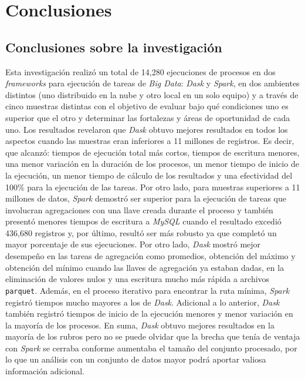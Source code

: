 \chapter*{Conclusiones}


\section{Conclusiones sobre la investigación}

Esta investigación realizó un total de 14,280 ejecuciones de procesos en dos \textit{frameworks} para ejecución de tareas de \textit{Big Data}: \textit{Dask} y \textit{Spark}, en dos ambientes distintos (uno distribuido en la nube y otro local en un solo equipo) y a través de cinco muestras distintas con el objetivo de evaluar bajo qué condiciones uno es superior que el otro y determinar las fortalezas y áreas de oportunidad de cada uno. Los resultados revelaron que \textit{Dask} obtuvo mejores resultados en todos los aspectos cuando las muestras eran inferiores a 11 millones de registros. Es decir, que alcanzó: tiempos de ejecución total más cortos, tiempos de escritura menores, una menor variación en la duración de los procesos, un menor tiempo de inicio de la ejecución, un menor tiempo de cálculo de los resultados y una efectividad del 100\% para la ejecución de las tareas. Por otro lado, para muestras superiores a 11 millones de datos, \textit{Spark} demostró ser superior para la ejecución de tareas que involucran agregaciones con una llave creada durante el proceso y también presentó menores tiempos de escritura a \textit{MySQL} cuando el resultado excedió 436,680 registros y, por último, resultó ser más robusto ya que completó un mayor porcentaje de sus ejecuciones. Por otro lado, \textit{Dask} mostró mejor desempeño en las tareas de agregación como promedios, obtención del máximo y obtención del mínimo cuando las llaves de agregación ya estaban dadas, en la eliminación de valores nulos y una escritura mucho más rápida a archivos \texttt{parquet}. Además, en el proceso iterativo para encontrar la ruta mínima, \textit{Spark} registró tiempos mucho mayores a los de \textit{Dask}. Adicional a lo anterior, \textit{Dask} también registró tiempos de inicio de la ejecución menores y menor variación en la mayoría de los procesos.  En suma, \textit{Dask} obtuvo mejores resultados en la mayoría de los rubros pero no se puede olvidar que la brecha que tenía de ventaja con \textit{Spark} se cerraba conforme aumentaba el tamaño del conjunto procesado, por lo que un análisis con un conjunto de datos mayor podrá aportar valiosa información adicional.

